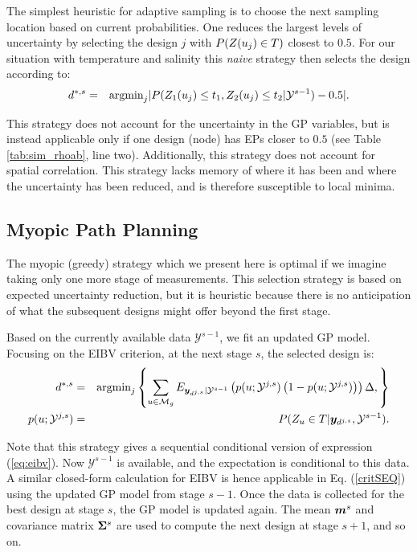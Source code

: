 \documentclass[aoas]{imsart}
\begin{document}
The simplest heuristic for adaptive sampling is to choose the next
sampling location based on current probabilities. One reduces the largest levels of uncertainty by selecting the design $j$ with $P(Z(u_j) \in T)$ closest to $0.5$.
For our situation with temperature and salinity this {\it{naive}} strategy then
selects the design according to:
\begin{eqnarray}\label{critNaive}
    d^{*,s} &=& \mbox{argmin}_{j} |P(Z_1(\x_j) \leq t_1, Z_2(\x_j) \leq t_2 | \mathcal{Y}^{s-1})-0.5|. \nonumber
\end{eqnarray}

This strategy does not account for the uncertainty in the GP variables, but is instead applicable only if one design (node) has EPs closer to
$0.5$ (see Table \ref{tab:sim_rhoab}, line two). Additionally, this strategy does not
account for spatial correlation. This strategy lacks memory of where
it has been and where the uncertainty has been reduced, and is therefore
susceptible to local minima.

\subsection{Myopic Path Planning}
\label{sec:myopic}

The myopic (greedy) strategy which we present here is optimal if we
imagine taking only one more stage of measurements. This selection
strategy is based on expected uncertainty reduction, but it is heuristic because there is no anticipation of what the subsequent designs might
offer beyond the first stage.

Based on the currently available data $\mathcal{Y}^{s-1}$, we
fit an updated GP model. Focusing on the EIBV criterion, at the next stage $s$, the selected design is:
\begin{eqnarray}\label{critSEQ}
    d^{*,s} &=& \mbox{argmin}_{j} \left\{ \sum_{\x \in \mathcal{M}_g} E_{\by_{d^{j,s}}|\mathcal{Y}^{s-1}} \left( p(\x;\mathcal{Y}^{j,s})\left( 1-p(\x;\mathcal{Y}^{j,s})\right) \right) \Delta, \right\} \\
    p(\x;\mathcal{Y}^{j,s}) &=& P(Z_u \in T |\by_{d^{j,s}},\mathcal{Y}^{s-1}). \nonumber
\end{eqnarray}

Note that this strategy gives a sequential conditional version of
expression (\ref{eq:eibv}). Now $\mathcal{Y}^{s-1}$ is available, and
the expectation is conditional to this data. A similar closed-form calculation
for EIBV is hence applicable in Eq. (\ref{critSEQ}) using the
updated GP model from stage $s-1$. Once the data is collected for the
best design at stage $s$, the GP model is updated again. The mean ${\boldsymbol m}^{s}$ and
covariance matrix ${\boldsymbol \Sigma}^{s}$ are used to compute the next design at
stage $s+1$, and so on.
\end{document}
